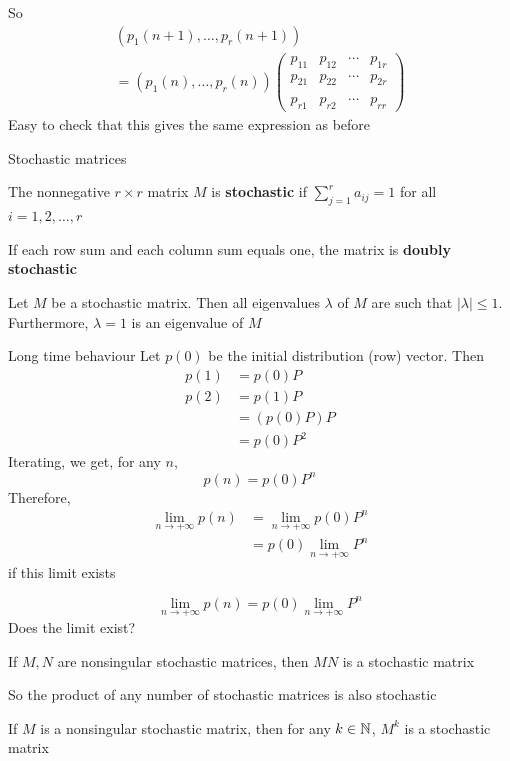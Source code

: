 \documentclass[aspectratio=43]{beamer}
\begin{document}
\begin{frame}
So
\begin{multline*}
(p_1(n+1),\ldots,p_r(n+1))  \\
=
(p_1(n),\ldots,p_r(n)) 
\begin{pmatrix}
p_{11} & p_{12} & \cdots & p_{1r} \\
p_{21} & p_{22} & \cdots & p_{2r} \\
&&& \\
p_{r1} & p_{r2} & \cdots & p_{rr}
\end{pmatrix}
\end{multline*}
\vfill
Easy to check that this gives the same expression as before
\end{frame}



\begin{frame}{Stochastic matrices}
\begin{definition}
The nonnegative $r\times r$ matrix $M$ is \textbf{stochastic} if $\sum_{j=1}^ra_{ij}=1$ for all $i=1,2,\dots, r$
\end{definition}
\vfill
If each row sum and each column sum equals one, the matrix is \textbf{doubly stochastic}
\vfill
\begin{theorem}\label{th:spectrum_stochastic_matrix}
Let $M$ be a stochastic matrix. Then all eigenvalues $\lambda$ of $M$ are such that $|\lambda|\leq 1$. 
Furthermore, $\lambda =1$ is an eigenvalue of $M$
\end{theorem}
\end{frame}

\begin{frame}{Long time behaviour}
Let $p(0)$ be the initial distribution (row) vector. Then
\begin{align*}
p(1) &= p(0)P \\
p(2) &= p(1)P\\
&= (p(0)P)P \\
&= p(0)P^2
\end{align*}
\vfill
Iterating, we get, for any $n$,
\[
p(n)=p(0)P^n
\]
\vfill
Therefore, 
\begin{align*}
\lim_{n\rightarrow +\infty}p(n) &=
\lim_{n\rightarrow +\infty}p(0)P^n \\
&=p(0)\lim_{n\rightarrow +\infty}P^n
\end{align*}
if this limit exists
\end{frame}


\begin{frame}
\[
\lim_{n\rightarrow +\infty}p(n) = 
p(0)\lim_{n\rightarrow +\infty}P^n
\]
Does the limit exist?
\vfill
\begin{theorem}
If $M,N$ are nonsingular stochastic matrices, then $MN$ is a stochastic matrix
\end{theorem}
\vfill
So the product of any number of stochastic matrices is also stochastic
\vfill
\begin{corollary}
If $M$ is a nonsingular stochastic matrix, then for any $k\in\mathbb{N}$, $M^k$ is a stochastic matrix
\end{corollary}
\end{frame}
\end{document}
